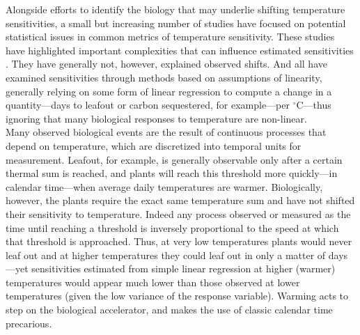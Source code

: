 \documentclass[11pt,letter]{article}
\begin{document}
Alongside efforts to identify the biology that may underlie shifting temperature sensitivities, a small but increasing number of studies have focused on potential statistical issues in common metrics of temperature sensitivity. These studies have highlighted important complexities that can influence estimated sensitivities \citep{clark2014a,gusewell2017,keenan2019}. They have generally not, however, explained observed shifts. And all have examined sensitivities through methods based on assumptions of linearity, generally relying on some form of linear regression to compute a change in a quantity---days to leafout or carbon sequestered, for example---per $^{\circ}$C---thus ignoring that many biological responses to temperature are non-linear. \\ %

Many observed biological events are the result of continuous processes that depend on temperature, which are discretized into temporal units for measurement. Leafout, for example, is generally observable only after a certain thermal sum is reached, and plants will reach this threshold more quickly---in calendar time---when average daily temperatures are warmer. Biologically, however, the plants require the exact same temperature sum and have not shifted their sensitivity to temperature. Indeed any process observed or measured as the time until reaching a threshold is inversely proportional to the speed at which that threshold is approached. Thus, at very low temperatures plants would never leaf out and at higher temperatures they could leaf out in only a matter of days---yet sensitivities estimated from simple linear regression at higher (warmer) temperatures would appear much lower than those observed at lower temperatures (given the low variance of the response variable). Warming acts to step on the biological accelerator, and makes the use of classic calendar time precarious. \\
\end{document}

